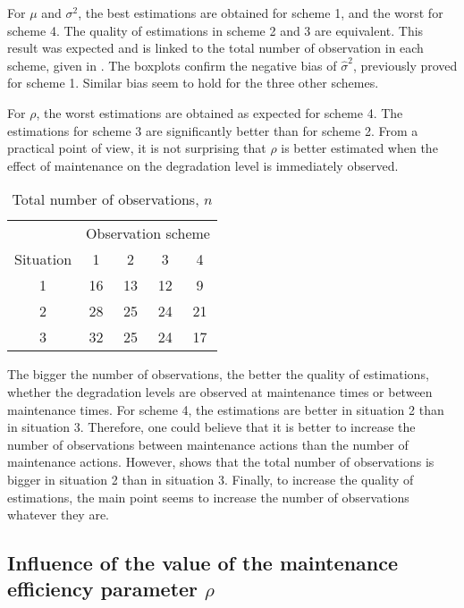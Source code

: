 For $\mu$ and $\sigma^2$, the best estimations are obtained for scheme 1, and the worst for scheme 4. The quality of estimations in scheme 2 and 3 are equivalent. This result was expected and is linked to the total number of observation in each scheme, given in . The boxplots confirm the negative bias of $\hat\sigma^2$, previously proved for scheme 1. Similar bias seem to hold for the three other schemes.

For $\rho$, the worst estimations are obtained as expected for scheme 4. The estimations for scheme 3 are significantly better than for scheme 2. From a practical point of view, it is not surprising that $\rho$  is better estimated when  the effect of maintenance on the degradation level is immediately observed.


\begin{table} [!h]
\caption{Total number of observations, $n$}
\centering
\label{table:n}
\begin{tabular}{|c|c|c|c|c|}
\cline{2-5}
\multicolumn{1}{c|}{}& \multicolumn{4}{c|}{Observation scheme} \\
\cline{1-1}

Situation & \multicolumn{1}{c}{1}&\multicolumn{1}{c}{2}&\multicolumn{1}{c}{3}&\multicolumn{1}{c|}{4}  \\
\cline{2-5}
1& 16&13&12&9\\
2&28 &25 &24 &21  \\
3 &32&25&24&17\\

\hline
\end{tabular}
\end{table}

The bigger the number of observations, the better the quality of estimations, whether the degradation levels are observed at maintenance times or between maintenance times.
For scheme 4, the estimations are better in situation 2 than in situation 3. Therefore, one could believe that it is better to increase the  number of observations between maintenance actions than the number of maintenance actions. However,  shows that the total number of observations is bigger in situation 2 than in situation 3. Finally, to increase the quality of estimations, the main point seems to increase the number of observations whatever they are.



\subsection{Influence of the value of the maintenance efficiency parameter $\rho$}

